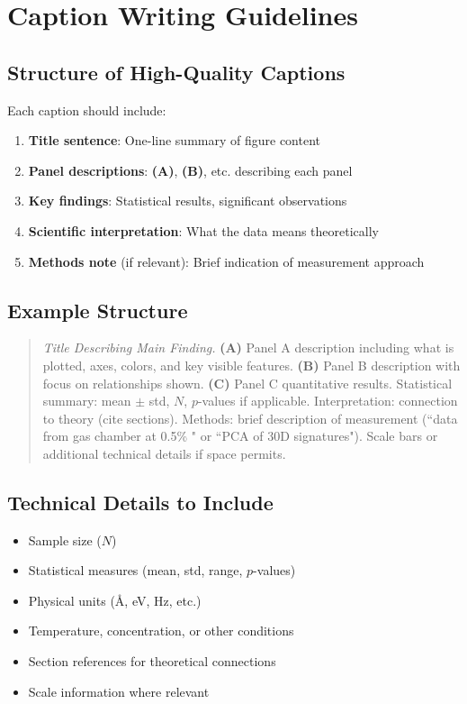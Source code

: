 \documentclass[11pt]{article}
\begin{document}
\newpage

\section{Caption Writing Guidelines}

\subsection{Structure of High-Quality Captions}

Each caption should include:

\begin{enumerate}
\item \textbf{Title sentence}: One-line summary of figure content
\item \textbf{Panel descriptions}: \textbf{(A)}, \textbf{(B)}, etc. describing each panel
\item \textbf{Key findings}: Statistical results, significant observations
\item \textbf{Scientific interpretation}: What the data means theoretically
\item \textbf{Methods note} (if relevant): Brief indication of measurement approach
\end{enumerate}

\subsection{Example Structure}

\begin{quote}
\textit{Title Describing Main Finding.} \textbf{(A)} Panel A description including what is plotted, axes, colors, and key visible features. \textbf{(B)} Panel B description with focus on relationships shown. \textbf{(C)} Panel C quantitative results. Statistical summary: mean $\pm$ std, $N$, $p$-values if applicable. Interpretation: connection to theory (cite sections). Methods: brief description of measurement (``data from gas chamber at 0.5\% " or ``PCA of 30D signatures"). Scale bars or additional technical details if space permits.
\end{quote}

\subsection{Technical Details to Include}

\begin{itemize}
\item Sample size ($N$)
\item Statistical measures (mean, std, range, $p$-values)
\item Physical units (Å, eV, Hz, etc.)
\item Temperature, concentration, or other conditions
\item Section references for theoretical connections
\item Scale information where relevant
\end{itemize}
\end{document}
